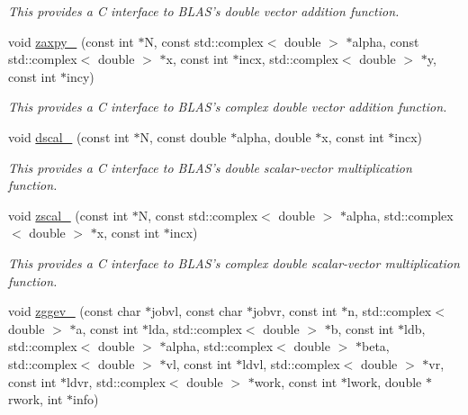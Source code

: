 \begin{DoxyCompactItemize}
\begin{DoxyCompactList}\small\item\em This provides a C interface to B\-L\-A\-S's double vector addition function. \end{DoxyCompactList}\item 
\hypertarget{namespacekeycpp_a6460fa334239dde761d8f737b9438fed}{void \hyperlink{namespacekeycpp_a6460fa334239dde761d8f737b9438fed}{zaxpy\-\_\-} (const int $\ast$N, const std\-::complex$<$ double $>$ $\ast$alpha, const std\-::complex$<$ double $>$ $\ast$x, const int $\ast$incx, std\-::complex$<$ double $>$ $\ast$y, const int $\ast$incy)}\label{namespacekeycpp_a6460fa334239dde761d8f737b9438fed}

\begin{DoxyCompactList}\small\item\em This provides a C interface to B\-L\-A\-S's complex double vector addition function. \end{DoxyCompactList}\item 
\hypertarget{namespacekeycpp_a7d249dd978770119c1b91d88009fefbd}{void \hyperlink{namespacekeycpp_a7d249dd978770119c1b91d88009fefbd}{dscal\-\_\-} (const int $\ast$N, const double $\ast$alpha, double $\ast$x, const int $\ast$incx)}\label{namespacekeycpp_a7d249dd978770119c1b91d88009fefbd}

\begin{DoxyCompactList}\small\item\em This provides a C interface to B\-L\-A\-S's double scalar-\/vector multiplication function. \end{DoxyCompactList}\item 
\hypertarget{namespacekeycpp_ad9dd69d0d355e4805a832813199f1dff}{void \hyperlink{namespacekeycpp_ad9dd69d0d355e4805a832813199f1dff}{zscal\-\_\-} (const int $\ast$N, const std\-::complex$<$ double $>$ $\ast$alpha, std\-::complex$<$ double $>$ $\ast$x, const int $\ast$incx)}\label{namespacekeycpp_ad9dd69d0d355e4805a832813199f1dff}

\begin{DoxyCompactList}\small\item\em This provides a C interface to B\-L\-A\-S's complex double scalar-\/vector multiplication function. \end{DoxyCompactList}\item 
\hypertarget{namespacekeycpp_ace2501951ab3db3a91c3520ae89750b1}{void \hyperlink{namespacekeycpp_ace2501951ab3db3a91c3520ae89750b1}{zggev\-\_\-} (const char $\ast$jobvl, const char $\ast$jobvr, const int $\ast$n, std\-::complex$<$ double $>$ $\ast$a, const int $\ast$lda, std\-::complex$<$ double $>$ $\ast$b, const int $\ast$ldb, std\-::complex$<$ double $>$ $\ast$alpha, std\-::complex$<$ double $>$ $\ast$beta, std\-::complex$<$ double $>$ $\ast$vl, const int $\ast$ldvl, std\-::complex$<$ double $>$ $\ast$vr, const int $\ast$ldvr, std\-::complex$<$ double $>$ $\ast$work, const int $\ast$lwork, double $\ast$rwork, int $\ast$info)}\label{namespacekeycpp_ace2501951ab3db3a91c3520ae89750b1}


\end{DoxyCompactItemize}

